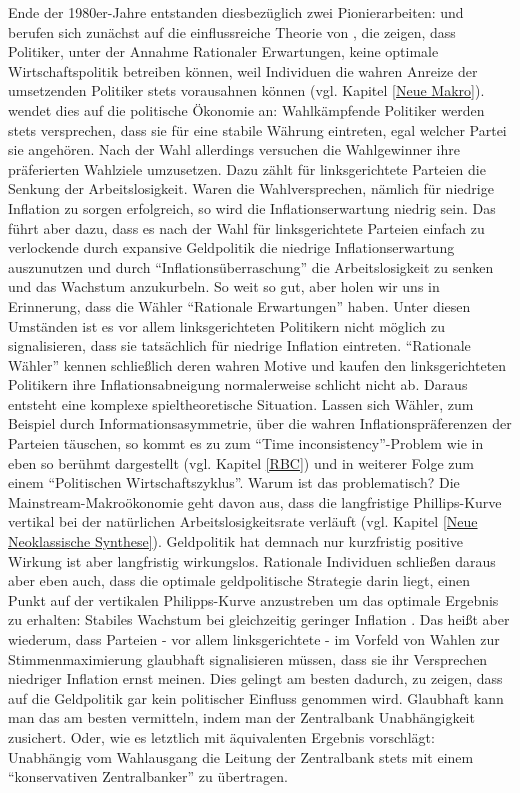 Ende der 1980er-Jahre entstanden diesbezüglich zwei Pionierarbeiten: \textcite{Rogoff1985} und \textcite{Alesina1987} berufen sich zunächst auf die einflussreiche Theorie von \textcite{Kydland1977}, die zeigen, dass Politiker, unter der Annahme Rationaler Erwartungen, keine optimale Wirtschaftspolitik betreiben können, weil Individuen die wahren Anreize der umsetzenden Politiker stets vorausahnen können (vgl. Kapitel \ref{Neue Makro}). \textcite{Alesina1987} wendet dies auf die politische Ökonomie an: Wahlkämpfende Politiker werden stets versprechen, dass sie für eine stabile Währung eintreten, egal welcher Partei sie angehören. Nach der Wahl allerdings versuchen die Wahlgewinner ihre präferierten Wahlziele umzusetzen. Dazu zählt für linksgerichtete Parteien die Senkung der Arbeitslosigkeit. Waren die Wahlversprechen, nämlich für niedrige Inflation zu sorgen erfolgreich, so wird die Inflationserwartung niedrig sein. Das führt aber dazu, dass es nach der Wahl für linksgerichtete Parteien einfach zu verlockende durch expansive Geldpolitik die niedrige Inflationserwartung auszunutzen und durch "`Inflationsüberraschung"' die Arbeitslosigkeit zu senken und das Wachstum anzukurbeln. So weit so gut, aber holen wir uns in Erinnerung, dass die Wähler "`Rationale Erwartungen"' haben. Unter diesen Umständen ist es vor allem linksgerichteten Politikern nicht möglich zu signalisieren, dass sie tatsächlich für niedrige Inflation eintreten. "`Rationale Wähler"' kennen schließlich deren wahren Motive und kaufen den linksgerichteten Politikern ihre Inflationsabneigung normalerweise schlicht nicht ab. Daraus entsteht eine komplexe spieltheoretische Situation. Lassen sich Wähler, zum Beispiel durch Informationsasymmetrie, über die wahren Inflationspräferenzen der Parteien täuschen, so kommt es zu zum "`Time inconsistency"'-Problem wie in \textcite{Kydland1977} eben so berühmt dargestellt (vgl. Kapitel \ref{RBC}) und in weiterer Folge zum einem "`Politischen Wirtschaftszyklus"'. Warum ist das problematisch? Die Mainstream-Makroökonomie geht davon aus, dass die langfristige Phillips-Kurve vertikal bei der natürlichen Arbeitslosigkeitsrate verläuft (vgl. Kapitel \ref{Neue Neoklassische Synthese}). Geldpolitik hat demnach nur kurzfristig positive Wirkung ist aber langfristig wirkungslos. Rationale Individuen schließen daraus aber eben auch, dass die optimale geldpolitische Strategie darin liegt, einen Punkt auf der vertikalen Philipps-Kurve anzustreben um das optimale Ergebnis zu erhalten: Stabiles Wachstum bei gleichzeitig geringer Inflation \parencite[S. 550]{Snowdon2005}. Das heißt aber wiederum, dass Parteien - vor allem linksgerichtete - im Vorfeld von Wahlen zur Stimmenmaximierung glaubhaft signalisieren müssen, dass sie ihr Versprechen niedriger Inflation ernst meinen. Dies gelingt am besten dadurch, zu zeigen, dass auf die Geldpolitik gar kein politischer Einfluss genommen wird. Glaubhaft kann man das am besten vermitteln, indem man der Zentralbank Unabhängigkeit zusichert. Oder, wie es \textcite[S. 1177]{Rogoff1985} letztlich mit äquivalenten Ergebnis vorschlägt: Unabhängig vom Wahlausgang die Leitung der Zentralbank stets mit einem "`konservativen Zentralbanker"' zu übertragen. 

